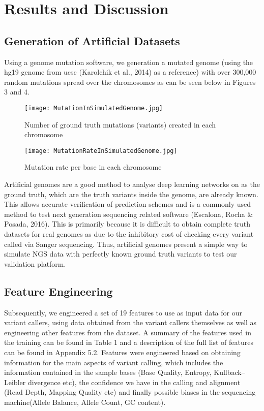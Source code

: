 \documentclass{article}
\begin{document}
\newpage
\section{Results and Discussion}
\subsection{Generation of Artificial Datasets}
Using a genome mutation software, we generation a mutated genome (using the hg19 genome from ucsc (Karolchik et al., 2014) as a reference) with over 300,000 random mutations spread over the chromosomes as can be seen below in Figures 3 and 4. 

\begin{figure}[H]
\centering
\texttt{[image: MutationInSimulatedGenome.jpg]}
\caption{Number of ground truth mutations (variants) created in each chromosome }
\end{figure}

\begin{figure}[H]
\centering
\texttt{[image: MutationRateInSimulatedGenome.jpg]}
\caption{Mutation rate per base in each chromosome}
\end{figure}

Artificial genomes are a good method to analyse deep learning networks on as the ground truth, which are the truth variants inside the genome, are already known. This allows accurate verification of prediction schemes and is a commonly used method to test next generation sequencing related software (Escalona, Rocha \& Posada, 2016). This is primarily because it is difficult to obtain complete truth datasets for real genomes as due to the inhibitory cost of checking every variant called via Sanger sequencing. Thus, artificial genomes present a simple way to simulate NGS data with perfectly known ground truth variants to test our validation platform.

\subsection{Feature Engineering}
Subsequently, we engineered a set of 19 features to use as input data for our variant callers, using data obtained from the variant callers themselves as well as engineering other features from the dataset. A summary of the features used in the training can be found in Table 1 and a description of the full list of features can be found in Appendix 5.2. Features were engineered based on obtaining information for the main aspects of variant calling, which includes the information contained in the sample bases (Base Quality, Entropy, Kullback–Leibler divergence etc), the confidence we have in the calling and alignment (Read Depth, Mapping Quality etc) and finally possible biases in the sequencing machine(Allele Balance, Allele Count, GC content).
\end{document}

